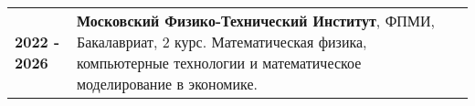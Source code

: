 \begin{tabularx}{\linewidth}{@{}l X@{}}	
  
  \textbf{2022 - 2026} & \textbf{Московский Физико-Технический Институт}, ФПМИ, Бакалавриат, 2 курс. 
  Математическая физика, компьютерные технологии и математическое моделирование в экономике.
\end{tabularx}